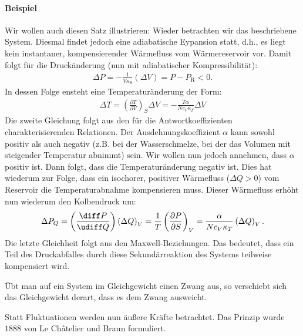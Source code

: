 \paragraph*{Beispiel} Wir wollen auch diesen Satz illustrieren: Wieder betrachten wir das beschriebene System. Diesmal findet jedoch eine adiabatische Eypansion statt, d.h., es liegt kein instantaner, kompensierender Wärmefluss vom Wärmereservoir vor. Damit folgt für die Druckänderung (nun mit adiabatischer Kompressibilität):
\begin{align*}
	\Delta P= -\frac{1}{V\kappa_S}\left(\Delta V\right)=P-P_\mathrm{R}<0.
\end{align*}
In dessen Folge ensteht eine Temperaturänderung der Form:
\begin{align*}
	\Delta T=\left(\frac{\partial T}{\partial V}\right)_S\Delta V=-\frac{T\alpha}{Nc_V\kappa_T}\Delta V
\end{align*}
Die zweite Gleichung folgt aus den für die Antwortkoeffizienten charakterisierenden Relationen. Der Ausdehnungskoeffizient $\alpha$ kann sowohl positiv als auch negativ (z.B. bei der Wasserschmelze, bei der das Volumen mit steigender Temperatur abnimmt) sein. 
Wir wollen nun jedoch annehmen, dass $\alpha$ positiv ist. Dann folgt, dass die Temperaturänderung negativ ist. Dies hat wiederum zur Folge, dass ein isochorer, positiver Wärmefluss ($\Delta Q>0$) vom Reservoir die Temperaturabnahme kompensieren muss. Dieser Wärmefluss erhöht nun wiederum den Kolbendruck um:
\begin{align*}
	\Delta P_Q=\left(\frac{\diff P}{\udiff Q}\right)\left(\Delta Q\right)_V=\frac{1}{T}\left(\frac{\partial P}{\partial S}\right)_V=\frac{\alpha}{Nc_V\kappa_T}\left(\Delta Q\right)_V.
\end{align*}
Die letzte Gleichheit folgt aus den Maxwell-Beziehungen. Das bedeutet, dass ein Teil des Druckabfalles durch diese Sekundärreaktion des Systems teilweise kompensiert wird. 
\begin{formal}
	 Übt man auf ein System im Gleichgewicht einen Zwang aus, so verschiebt sich das Gleichgewicht derart, dass es dem Zwang ausweicht.
\end{formal} 
Statt Fluktuationen werden nun äußere Kräfte betrachtet. Das Prinzip wurde  $1888$ von Le Châtelier und Braun formuliert.

